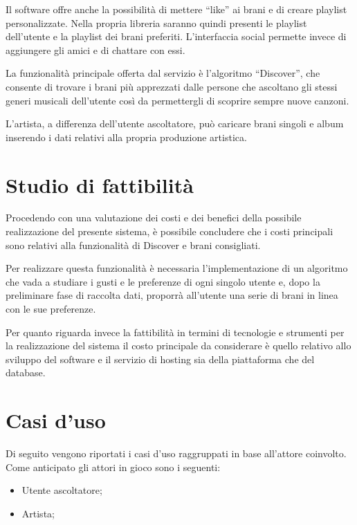 Il software offre anche la possibilità di mettere ``like'' ai brani e di creare playlist
personalizzate. Nella propria libreria saranno quindi presenti le playlist dell'utente e
la playlist dei brani preferiti. L'interfaccia social permette invece di aggiungere gli
amici e di chattare con essi.

La funzionalità principale offerta dal servizio è l'algoritmo ``Discover'', che consente
di trovare i brani più apprezzati dalle persone che ascoltano gli stessi generi musicali
dell'utente così da permettergli di scoprire sempre nuove canzoni.

L'artista, a differenza dell'utente ascoltatore, può caricare brani singoli e album
inserendo i dati relativi alla propria produzione artistica.


\vspace{1cm}
\section{Studio di fattibilità}
Procedendo con una valutazione dei costi e dei benefici della possibile realizzazione del
presente sistema, è possibile concludere che i costi principali sono relativi alla
funzionalità di Discover e brani consigliati. 

Per realizzare questa funzionalità è
necessaria l'implementazione di un algoritmo che vada a studiare i gusti e le preferenze
di ogni singolo utente e, dopo la preliminare fase di raccolta dati, proporrà all'utente
una serie di brani in linea con le sue preferenze. 

Per quanto riguarda invece la
fattibilità in termini di tecnologie e strumenti per la realizzazione del sistema 
il costo principale da considerare è quello relativo allo sviluppo del software e il servizio di hosting sia 
della piattaforma che del database. 


\newpage
\section{Casi d'uso}
Di seguito vengono riportati i casi d'uso raggruppati in base all'attore coinvolto. Come
anticipato gli attori in gioco sono i seguenti:
\begin{itemize}
      \item Utente ascoltatore;
      \item Artista;
\end{itemize}

\vspace{0.5cm}
